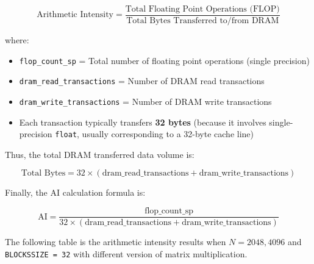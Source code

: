 \documentclass[11pt]{article}
\begin{document}
\[
\text{Arithmetic Intensity} = \frac{\text{Total Floating Point Operations (FLOP)}}{\text{Total Bytes Transferred to/from DRAM}}
\]

where:

\begin{itemize}
    \item \texttt{flop\_count\_sp} = Total number of floating point operations (single precision)
    \item \texttt{dram\_read\_transactions} = Number of DRAM read transactions
    \item \texttt{dram\_write\_transactions} = Number of DRAM write transactions
    \item Each transaction typically transfers \textbf{32 bytes} (because it involves single-precision \texttt{float}, usually corresponding to a 32-byte cache line)
\end{itemize}

Thus, the total DRAM transferred data volume is:

\[
\text{Total Bytes} = 32 \times (\text{dram\_read\_transactions} + \text{dram\_write\_transactions})
\]

Finally, the AI calculation formula is:

\[
\text{AI} = \frac{\text{flop\_count\_sp}}{32 \times (\text{dram\_read\_transactions} + \text{dram\_write\_transactions})
}
\]

The following table is the arithmetic intensity results when $N = 2048, 4096$ and \verb|BLOCKSSIZE = 32| with different version of matrix multiplication.
\begin{table}[H]
\centering
{}
\caption{Combined Profiling and Arithmetic Intensity (AI) for $N=2048$ and $N=4096$.}
\label{tab:AI_combined_updated}
\end{table}
\end{document}
